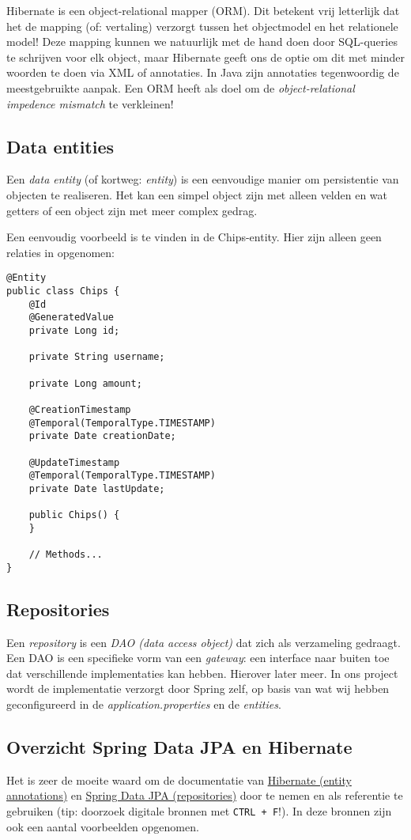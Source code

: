Hibernate is een object-relational mapper (ORM). Dit betekent vrij letterlijk
dat het de mapping (of: vertaling) verzorgt tussen het objectmodel 
en het relationele model!
Deze mapping kunnen we natuurlijk met de hand doen 
door SQL-queries te schrijven voor elk object, maar Hibernate geeft ons de optie 
om dit met minder woorden te doen via XML of annotaties. In Java zijn 
annotaties tegenwoordig de meestgebruikte aanpak.
Een ORM heeft als doel om de 
\textit{object-relational impedence mismatch} te verkleinen!

\subsection{Data entities}
Een \textit{data entity} (of kortweg: \textit{entity}) is 
een eenvoudige manier om persistentie van objecten te realiseren. 
Het kan een simpel object zijn met alleen velden en wat getters
of een object zijn met meer complex gedrag. 

Een eenvoudig voorbeeld is te vinden in de Chips-entity.
Hier zijn alleen geen relaties in opgenomen:

\begin{verbatim}
@Entity
public class Chips {
    @Id
    @GeneratedValue
    private Long id;

    private String username;

    private Long amount;

    @CreationTimestamp
    @Temporal(TemporalType.TIMESTAMP)
    private Date creationDate;

    @UpdateTimestamp
    @Temporal(TemporalType.TIMESTAMP)
    private Date lastUpdate;

    public Chips() {
    }

    // Methods...
}
\end{verbatim}

\subsection{Repositories}
Een \textit{repository} is een \textit{DAO (data access object)} 
dat zich als verzameling gedraagt. 
Een DAO is een specifieke vorm van een \textit{gateway}: 
een interface naar buiten toe dat verschillende implementaties kan hebben.
Hierover later meer.
In ons project wordt de implementatie verzorgt door Spring zelf, op basis van wat 
wij hebben geconfigureerd in de \textit{application.properties} en de \textit{entities}.

\subsection{Overzicht Spring Data JPA en Hibernate}
Het is zeer de moeite waard om de documentatie van 
\href{https://docs.jboss.org/hibernate/stable/annotations/reference/en/html_single/#entity-overview}{Hibernate (entity annotations)}
en 
\href{https://docs.spring.io/spring-data/jpa/docs/current/reference/html/#repositories}{Spring Data JPA (repositories)}
door te nemen en als referentie te gebruiken (tip: doorzoek digitale bronnen met \texttt{CTRL + F}!). 
In deze bronnen zijn ook een aantal voorbeelden opgenomen.

